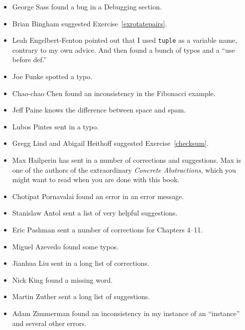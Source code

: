 \documentclass[10pt]{book}
\begin{document}
\begin{itemize}
\item George Sass found a bug in a Debugging section.

\item Brian Bingham suggested Exercise~\ref{exrotatepairs}.

\item Leah Engelbert-Fenton pointed out that I used {\tt tuple}
as a variable name, contrary to my own advice.  And then found
a bunch of typos and a ``use before def.''

\item Joe Funke spotted a typo.

\item Chao-chao Chen found an inconsistency in the Fibonacci example.

\item Jeff Paine knows the difference between space and spam.

\item Lubos Pintes sent in a typo.

\item Gregg Lind and Abigail Heithoff suggested Exercise~\ref{checksum}.

\item Max Hailperin has sent in a number of corrections and
  suggestions.  Max is one of the authors of the extraordinary {\em
    Concrete Abstractions}, which you might want to read when you are
  done with this book.

\item Chotipat Pornavalai found an error in an error message.

\item Stanislaw Antol sent a list of very helpful suggestions.

\item Eric Pashman sent a number of corrections for Chapters 4--11.

\item Miguel Azevedo found some typos.

\item Jianhua Liu sent in a long list of corrections.

\item Nick King found a missing word.

\item Martin Zuther sent a long list of suggestions.

\item Adam Zimmerman found an inconsistency in my instance
of an ``instance'' and several other errors.


\end{itemize}
\end{document}
